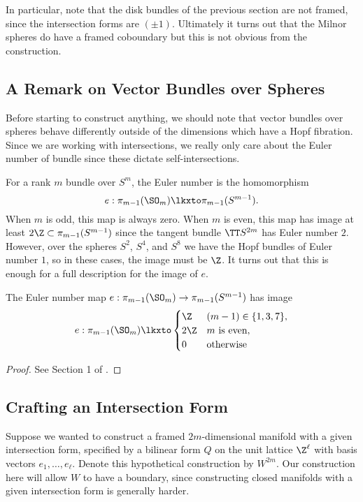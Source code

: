 In particular, note that the disk bundles of the previous section are not framed, since the intersection forms are $(\pm 1)$. Ultimately it turns out that the Milnor spheres do have a framed coboundary but this is not obvious from the construction.

\subsection{A Remark on Vector Bundles over Spheres}

Before starting to construct anything, we should note that vector bundles over spheres behave differently outside of the dimensions which have a Hopf fibration. Since we are working with intersections, we really only care about the Euler number of bundle since these dictate self-intersections. 

For a rank $m$ bundle over $S^m$, the Euler number is the homomorphism
\[
	e : \pi_{m-1}(\SO_m) \lkxto \pi_{m-1}(S^{m-1}).
\]
When $m$ is odd, this map is always zero. When $m$ is even, this map has image at least $2\Z\subset \pi_{m-1}(S^{m-1})$ since the tangent bundle $\TT S^{2m}$ has Euler number $2$. However, over the spheres $S^2$, $S^4$, and $S^8$ we have the Hopf bundles of Euler number $1$, so in these cases, the image must be $\Z$. It turns out that this is enough for a full description for the image of $e$.

\begin{proposition}\label{thm:possible-euler-numbers-over-spheres}
	The Euler number map $e : \pi_{m-1}(\SO_m) \to \pi_{m-1}(S^{m-1})$ has image
	\[
		e : \pi_{m-1}(\SO_m) \lkxto
		\begin{cases}
			\Z  & (m-1)\in\{1,3,7\},       \\
			2\Z & m\textrm{ is even}, \\
			0   & \textrm{otherwise}\end{cases}
	\]
\end{proposition}
\begin{proof}
	See Section 1 of \cite{levine1985lectures}.
\end{proof}

\subsection{Crafting an Intersection Form}

Suppose we wanted to construct a framed $2m$-dimensional manifold with a given intersection form, specified by a bilinear form $Q$ on the unit lattice $\Z^\ell$ with basis vectors $e_1,\ldots, e_\ell$. Denote this hypothetical construction by $W^{2m}$. Our construction here will allow $W$ to have a boundary, since constructing closed manifolds with a given intersection form is generally harder.

